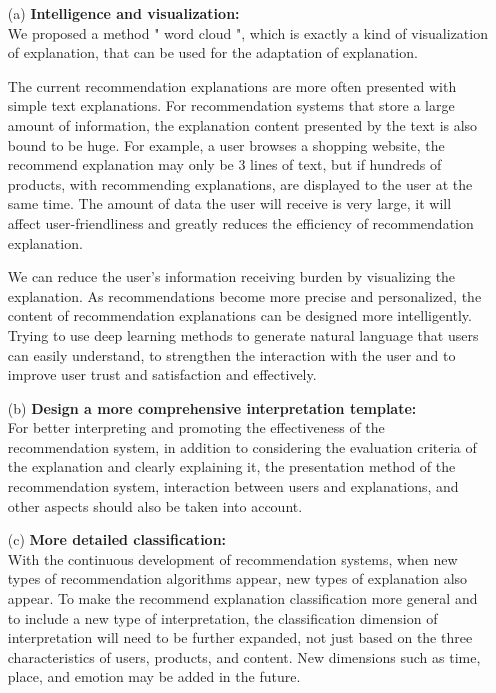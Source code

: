 \begin{itemize}

\item[(a)]{\textbf{Intelligence and visualization:}}\\
We proposed a method " word cloud ", which is exactly a kind of visualization of explanation, that can be used for the adaptation of explanation.
\par The current recommendation explanations are more often presented with simple text explanations. For recommendation systems that store a large amount of information, the explanation content presented by the text is also bound to be huge. For example, a user browses a shopping website, the recommend explanation may only be 3 lines of text, but if hundreds of products, with recommending explanations, are displayed to the user at the same time. The amount of data the user will receive is very large, it will affect user-friendliness and greatly reduces the efficiency of recommendation explanation.
\par We can reduce the user's information receiving burden by visualizing the explanation. As recommendations become more precise and personalized, the content of recommendation explanations can be designed more intelligently. Trying to use deep learning methods to generate natural language that users can easily understand, to strengthen the interaction with the user and to improve user trust and satisfaction and effectively.

\item[(b)]{\textbf{Design a more comprehensive interpretation template:}}\\
For better interpreting and promoting the effectiveness of the recommendation system, in addition to considering the evaluation criteria of the explanation and clearly explaining it, the presentation method of the recommendation system, interaction between users and explanations, and other aspects should also be taken into account.

\item[(c)]{\textbf{More detailed classification:}}\\
With the continuous development of recommendation systems, when new types of recommendation algorithms appear, new types of explanation also appear. To make the recommend explanation classification more general and to include a new type of interpretation, the classification dimension of interpretation will need to be further expanded, not just based on the three characteristics of users, products, and content. New dimensions such as time, place, and emotion may be added in the future.


\end{itemize}

